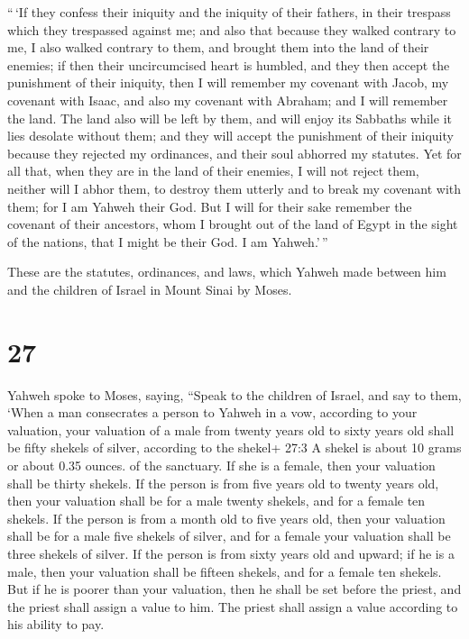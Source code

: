  ``\,`If they confess their iniquity and the iniquity of
their fathers, in their trespass which they trespassed against me; and
also that because they walked contrary to me,  I also
walked contrary to them, and brought them into the land of their
enemies; if then their uncircumcised heart is humbled, and they then
accept the punishment of their iniquity,  then I will
remember my covenant with Jacob, my covenant with Isaac, and also my
covenant with Abraham; and I will remember the land.  The
land also will be left by them, and will enjoy its Sabbaths while it
lies desolate without them; and they will accept the punishment of their
iniquity because they rejected my ordinances, and their soul abhorred my
statutes.  Yet for all that, when they are in the land of
their enemies, I will not reject them, neither will I abhor them, to
destroy them utterly and to break my covenant with them; for I am Yahweh
their God.  But I will for their sake remember the covenant
of their ancestors, whom I brought out of the land of Egypt in the sight
of the nations, that I might be their God. I am Yahweh.'\,''

 These are the statutes, ordinances, and laws, which Yahweh
made between him and the children of Israel in Mount Sinai by Moses.

\hypertarget{section-26}{%
\section{27}\label{section-26}}

 Yahweh spoke to Moses, saying,  ``Speak to the
children of Israel, and say to them, `When a man consecrates a person to
Yahweh in a vow, according to your valuation,  your
valuation of a male from twenty years old to sixty years old shall be
fifty shekels of silver, according to the shekel+ 27:3 A shekel is about
10 grams or about 0.35 ounces. of the sanctuary.  If she is
a female, then your valuation shall be thirty shekels.  If
the person is from five years old to twenty years old, then your
valuation shall be for a male twenty shekels, and for a female ten
shekels.  If the person is from a month old to five years
old, then your valuation shall be for a male five shekels of silver, and
for a female your valuation shall be three shekels of silver.
 If the person is from sixty years old and upward; if he is
a male, then your valuation shall be fifteen shekels, and for a female
ten shekels.  But if he is poorer than your valuation, then
he shall be set before the priest, and the priest shall assign a value
to him. The priest shall assign a value according to his ability to pay.


